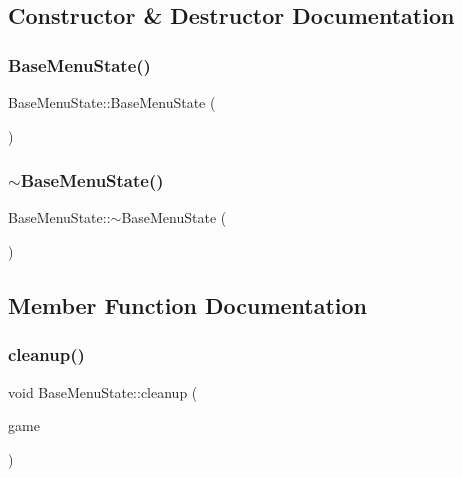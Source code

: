 \subsection{Constructor \& Destructor Documentation}
\mbox{\label{class_base_menu_state_aad9bd5a7fda48fc3dd9c1d6b22c707f7}} 
\subsubsection{\texorpdfstring{BaseMenuState()}{BaseMenuState()}}
{\footnotesize\ttfamily Base\+Menu\+State\+::\+Base\+Menu\+State (\begin{DoxyParamCaption}{ }\end{DoxyParamCaption})\hspace{0.3cm}{\ttfamily [inline]}}

\mbox{\label{class_base_menu_state_ae6c9f9087edfc4d738a1f42a6c77d170}} 
\subsubsection{\texorpdfstring{$\sim$BaseMenuState()}{~BaseMenuState()}}
{\footnotesize\ttfamily Base\+Menu\+State\+::$\sim$\+Base\+Menu\+State (\begin{DoxyParamCaption}{ }\end{DoxyParamCaption})\hspace{0.3cm}{\ttfamily [inline]}}



\subsection{Member Function Documentation}
\mbox{\label{class_base_menu_state_a6ca2a29b45a0c2d6d2cbbb6ee67d38ac}} 
\subsubsection{\texorpdfstring{cleanup()}{cleanup()}}
{\footnotesize\ttfamily void Base\+Menu\+State\+::cleanup (\begin{DoxyParamCaption}\item[{\mbox{\hyperlink{class_game_engine}{Game\+Engine}} $\ast$}]{game }\end{DoxyParamCaption})\hspace{0.3cm}{\ttfamily [virtual]}}



